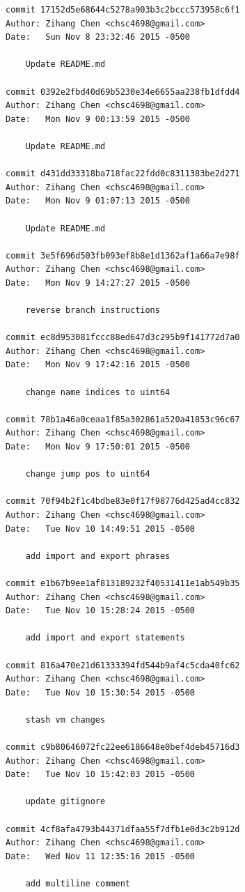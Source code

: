\documentclass{report}
\begin{document}
\begin{appendices}
\begin{verbatim}
commit 17152d5e68644c5278a903b3c2bccc573958c6f1
Author: Zihang Chen <chsc4698@gmail.com>
Date:   Sun Nov 8 23:32:46 2015 -0500

    Update README.md

commit 0392e2fbd40d69b5230e34e6655aa238fb1dfdd4
Author: Zihang Chen <chsc4698@gmail.com>
Date:   Mon Nov 9 00:13:59 2015 -0500

    Update README.md

commit d431dd33318ba718fac22fdd0c8311383be2d271
Author: Zihang Chen <chsc4698@gmail.com>
Date:   Mon Nov 9 01:07:13 2015 -0500

    Update README.md

commit 3e5f696d503fb093ef8b8e1d1362af1a66a7e98f
Author: Zihang Chen <chsc4698@gmail.com>
Date:   Mon Nov 9 14:27:27 2015 -0500

    reverse branch instructions

commit ec8d953081fccc88ed647d3c295b9f141772d7a0
Author: Zihang Chen <chsc4698@gmail.com>
Date:   Mon Nov 9 17:42:16 2015 -0500

    change name indices to uint64

commit 78b1a46a0ceaa1f85a302861a520a41853c96c67
Author: Zihang Chen <chsc4698@gmail.com>
Date:   Mon Nov 9 17:50:01 2015 -0500

    change jump pos to uint64

commit 70f94b2f1c4bdbe83e0f17f98776d425ad4cc832
Author: Zihang Chen <chsc4698@gmail.com>
Date:   Tue Nov 10 14:49:51 2015 -0500

    add import and export phrases

commit e1b67b9ee1af813189232f40531411e1ab549b35
Author: Zihang Chen <chsc4698@gmail.com>
Date:   Tue Nov 10 15:28:24 2015 -0500

    add import and export statements

commit 816a470e21d61333394fd544b9af4c5cda40fc62
Author: Zihang Chen <chsc4698@gmail.com>
Date:   Tue Nov 10 15:30:54 2015 -0500

    stash vm changes

commit c9b80646072fc22ee6186648e0bef4deb45716d3
Author: Zihang Chen <chsc4698@gmail.com>
Date:   Tue Nov 10 15:42:03 2015 -0500

    update gitignore

commit 4cf8afa4793b44371dfaa55f7dfb1e0d3c2b912d
Author: Zihang Chen <chsc4698@gmail.com>
Date:   Wed Nov 11 12:35:16 2015 -0500

    add multiline comment


\end{verbatim}
\end{appendices}
\end{document}
